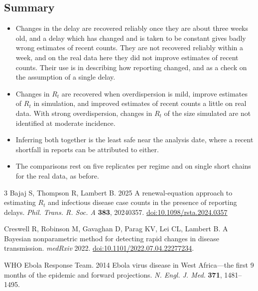 \documentclass[11pt,a4paper]{article}
\begin{document}
\subsection{Summary}

\begin{itemize}[itemsep=2pt]
\item Changes in the delay are recovered reliably once they are about three
weeks old, and a delay which has changed and is taken to be constant gives
badly wrong estimates of recent counts. They are not recovered reliably
within a week, and on the real data here they did not improve estimates of
recent counts. Their use is in describing how reporting changed, and as a
check on the assumption of a single delay.
\item Changes in $R_t$ are recovered when overdispersion is mild, improve
estimates of $R_t$ in simulation, and improved estimates of recent counts a
little on real data. With strong overdispersion, changes in $R_t$ of the size
simulated are not identified at moderate incidence.
\item Inferring both together is the least safe near the analysis date, where
a recent shortfall in reports can be attributed to either.
\item The comparisons rest on five replicates per regime and on single short
chains for the real data, as before.
\end{itemize}

\begin{thebibliography}{3}
Bajaj S, Thompson R, Lambert B. 2025
A renewal-equation approach to estimating $R_t$ and infectious disease case
counts in the presence of reporting delays.
\emph{Phil. Trans. R. Soc. A} \textbf{383}, 20240357.
\href{https://doi.org/10.1098/rsta.2024.0357}{doi:10.1098/rsta.2024.0357}

Creswell R, Robinson M, Gavaghan D, Parag KV, Lei CL, Lambert B. A Bayesian
nonparametric method for detecting rapid changes in disease transmission.
\emph{medRxiv} 2022.
\href{https://doi.org/10.1101/2022.07.04.22277234}{doi:10.1101/2022.07.04.22277234}.

WHO Ebola Response Team. 2014
Ebola virus disease in West Africa---the first 9 months of the epidemic and
forward projections.
\emph{N. Engl. J. Med.} \textbf{371}, 1481--1495.
\end{thebibliography}
\end{document}
